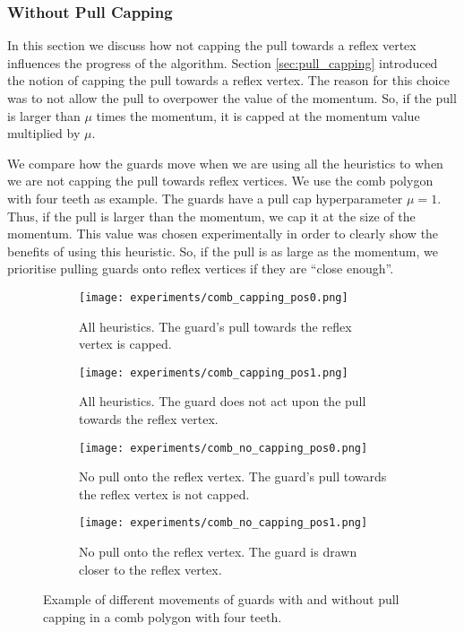 \newpage
\subsubsection{Without Pull Capping}
In this section we  discuss how not capping the pull towards a reflex vertex influences the progress of the algorithm. Section \ref{sec:pull_capping} introduced the notion of capping the pull towards a reflex vertex. The reason for this choice was to not allow the pull to overpower the value of the momentum. So, if the pull is larger than $\mu$ times the momentum, it is capped at the momentum value multiplied by $\mu$. 

We  compare how the guards move when we are using all the heuristics to when we are not capping the pull towards reflex vertices. We  use the comb polygon with four teeth as example. The guards have a pull cap hyperparameter $\mu = 1$. Thus, if the pull is larger than the momentum, we cap it at the size of the momentum. This value was chosen experimentally in order to clearly show the benefits of using this heuristic. So, if the pull is as large as the momentum, we prioritise pulling guards onto reflex vertices if they are ``close enough''.


\begin{figure}[h!]
    \centering
    \begin{subfigure}{0.45\textwidth}
        \texttt{[image: experiments/comb\_capping\_pos0.png]}
        \caption{All heuristics. The guard's pull towards the reflex vertex is capped.}
        \label{fig:all_cap_pos0}
    \end{subfigure}
    \hfill
    \begin{subfigure}{0.45\textwidth}
        \texttt{[image: experiments/comb\_capping\_pos1.png]}
        \caption{All heuristics. The guard does not act upon the pull towards the reflex vertex.}
        \label{fig:all_cap_pos1}
    \end{subfigure}
    \vfill
    \begin{subfigure}{0.45\textwidth}
        \texttt{[image: experiments/comb\_no\_capping\_pos0.png]}
        \caption{No pull onto the reflex vertex. The guard's pull towards the reflex vertex is not capped.}
        \label{fig:no_cap_pos0}
    \end{subfigure}
    \hfill
    \begin{subfigure}{0.45\textwidth}
        \texttt{[image: experiments/comb\_no\_capping\_pos1.png]}
        \caption{No pull onto the reflex vertex. The guard is drawn closer to the reflex vertex.}
        \label{fig:no_cap_pos1}
    \end{subfigure}
    \caption{Example of different movements of guards with and without pull capping in a comb polygon with four teeth.}
    \label{fig:no_cap_eg}
\end{figure}

